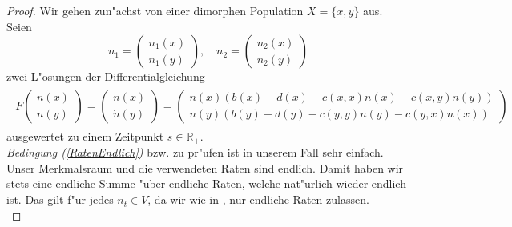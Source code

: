 \documentclass[11pt, a4paper, german]{article}
\theoremstyle{plain}
\newcommand{\tvec}[2]{\begin{pmatrix}#1\\#2\end{pmatrix}}
\begin{document}
	\begin{proof}
		Wir gehen zun"achst von einer dimorphen Population $ X = \{x,y\} $ aus. Seien
		\[ n_1 = \tvec{n_1(x)}{n_1(y)}, \quad n_2 = \tvec{n_2(x)}{n_2(y)} \]
		zwei L"osungen der Differentialgleichung
		\begin{align}
		\begin{split}
		F\tvec{n(x)}{n(y)} = \tvec{\dot{n}(x)}{\dot{n}(y)} =  \tvec{n(x)(b(x)-d(x)-c(x,x)n(x)-c(x,y)n(y))}{n(y)(b(y)-d(y)-c(y,y)n(y)-c(y,x)n(x))}\label{nDGL}
		\end{split}
		\end{align}
		ausgewertet zu einem Zeitpunkt $ s \in \mathbb{R}_{+} $.\\
	
		\textit{Bedingung (\ref{RatenEndlich})} bzw. \cite[Kapitel 11 - \textbf{Thm 2.1} (2.6)]{ethier2009markov} zu pr"ufen ist in unserem Fall sehr einfach.
		Unser Merkmalsraum und die verwendeten Raten sind endlich. Damit haben wir stets eine endliche Summe "uber endliche Raten, welche nat"urlich wieder endlich ist. Das gilt f"ur jedes $ n_t \in V $, da wir wie in \cite{fournier2004microscopic}, nur endliche Raten zulassen.\\
	

\end{proof}
\end{document}
